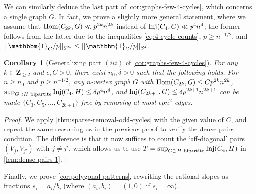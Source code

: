\documentclass[reqno,11pt]{amsart}
\newtheorem{corollary}[theorem]{Corollary}
\theoremstyle{definition}
\theoremstyle{remark}
\newtheorem*{remark}{Remark}
\numberwithin{equation}{section}
\newcommand{\Z}{\mathbf{Z}}
\newcommand{\one}{\mathbbm{1}}
\newcommand{\Hom}{\textnormal{Hom}}
\newcommand{\Inj}{\textnormal{Inj}}
\begin{document}
We can similarly deduce the last part of \cref{cor:graphs-few-4-cycles}, which concerns a single graph $G$. In fact, we prove a slightly more general statement, where we assume that $\Hom(C_{2k}, G) \ll p^{2k} n^{2k}$ instead of $\Inj(C_4, G) \ll p^4 n^4$; the former follows from the latter due to the inequalities \cref{eq:4-cycle-counts}, $p \ge n^{-1/2}$, and $||\one_G/p||_{S^{2k}} \le ||\one_G/p||_{S^4}$.

\begin{corollary}[Generalizing part $(iii)$ of \cref{cor:graphs-few-4-cycles}]
For any $k \in \Z_{\ge 2}$ and $\epsilon, C > 0$, there exist $n_0, \delta > 0$ such that the following holds. For $n \ge n_0$ and $p \ge n^{-1/2}$, any $n$-vertex graph $G$ with $\Hom(C_{2k}, G) \le Cp^{2k} n^{2k}$, $\sup_{G \supset H \textnormal{ bipartite}} \Inj(C_4, H) \le \delta p^4 n^4$, and $\Inj(C_{2k+1}, G) \le \delta p^{2k+1} n^{2k+1}$ can be made $\{C_3, C_5, \ldots, C_{2k+1}\}$-free by removing at most $\epsilon pn^2$ edges. 
\end{corollary}

\begin{proof}
We apply \cref{thm:sparse-removal-odd-cycles} with the given value of $C$, and repeat the same reasoning as in the previous proof to verify the dense pairs condition. The difference is that it now suffices to count the `off-diagonal' pairs $(V_j, V_{j'})$ with $j \neq j'$, which allows us to use $T = \sup_{G \supset H \textnormal{ bipartite}} \Inj(C_4, H)$ in \cref{lem:dense-pairs-1}.
\end{proof}

Finally, we prove \cref{cor:polygonal-patterns}, rewriting the rational slopes as fractions $s_i = a_i/b_i$ (where $(a_i, b_i) = (1, 0)$ if $s_i = \infty$).
\end{document}
